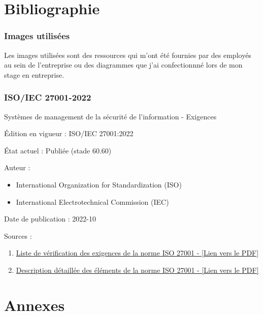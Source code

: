 \section*{Bibliographie}
\subsubsection{Images utilisées}\label{images}
Les images utilisées sont des ressources qui m'ont été fournies par des employés au sein de l'entreprise ou des diagrammes que j'ai confectionnné lors de mon stage en entreprise.

\subsubsection{ISO/IEC 27001-2022}\label{iso}
Systèmes de management de la sécurité de l'information - Exigences\par
Édition en vigueur : ISO/IEC 27001:2022\par
État actuel : Publiée (stade 60.60)\par
Auteur : 
\begin{itemize}
    \item International Organization for Standardization (ISO)
    \item International Electrotechnical Commission (IEC)
\end{itemize}\par
Date de publication : 2022-10\par
Sources : 
\begin{enumerate}
    \item \href{https://www.cssia.org/wp-content/uploads/2020/01/ISO_27001_Standard.pdf}{\textcolor{imtneCeleste}{Liste de vérification des exigences de la norme ISO 27001 - [Lien vers le PDF]}}
    \item \href{http://www.itref.ir/uploads/editor/2ef522.pdf}{\textcolor{imtneCeleste}{Description détaillée des éléments de la norme ISO 27001 - [Lien vers le PDF]}}
\end{enumerate}






\newpage
\section*{Annexes}
